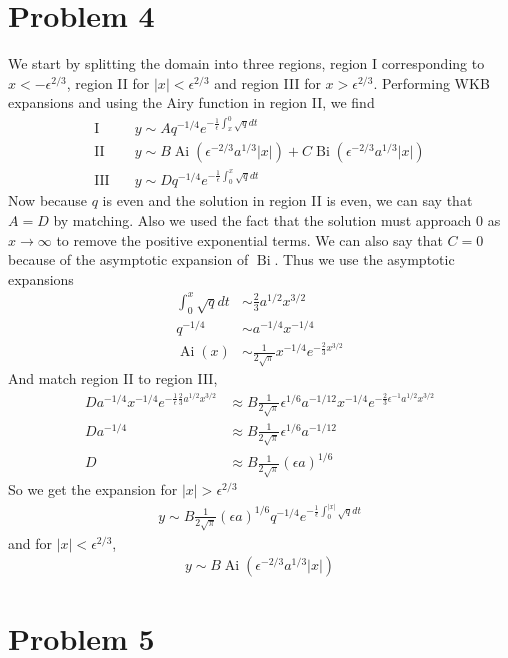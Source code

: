 \documentclass[12pt]{article}
\newcommand{\eq}[1]{\begin{align*}#1\end{align*}}
\newcommand{\Ai}{\operatorname{Ai}}
\newcommand{\Bi}{\operatorname{Bi}}
\begin{document}
\section*{Problem 4} We start by splitting the domain into three regions, region I corresponding to $x < -\epsilon^{2/3}$, region II for $|x| < \epsilon^{2/3}$ and region III for $x > \epsilon^{2/3}$. Performing WKB expansions and using the Airy function in region II, we find
\eq{
	\text{I}\quad& y \sim A q^{-1/4} e^{-\frac{1}{\epsilon}\int_x^0 \sqrt{q} dt}\\
	\text{II}\quad& y \sim B \Ai(\epsilon^{-2/3} a^{1/3} |x|) + C \Bi(\epsilon^{-2/3} a^{1/3} |x|)\\
	\text{III}\quad& y \sim D q^{-1/4} e^{-\frac{1}{\epsilon}\int_0^x \sqrt{q} dt}
}
Now because $q$ is even and the solution in region II is even, we can say that $A = D$ by matching. Also we used the fact that the solution must approach 0 as $x \rightarrow \infty$ to remove the positive exponential terms. We can also say that $C = 0$ because of the asymptotic expansion of $\Bi$. Thus we use the asymptotic expansions
\eq{
	\int_0^x \sqrt{q} dt &\sim \frac{2}{3}a^{1/2}x^{3/2}\\
	q^{-1/4} &\sim a^{-1/4}x^{-1/4}\\
	\Ai(x) &\sim \frac{1}{2\sqrt{\pi}} x^{-1/4}e^{-\frac{2}{3}x^{3/2}}
}
And match region II to region III,
\eq{
	Da^{-1/4}x^{-1/4}e^{-\frac{1}{\epsilon} \frac{2}{3} a^{1/2} x^{3/2}} &\approx B\frac{1}{2\sqrt{\pi}} \epsilon^{1/6}a^{-1/12}x^{-1/4}e^{-\frac{2}{3} \epsilon^{-1} a^{1/2} x^{3/2}}\\
	Da^{-1/4}&\approx B\frac{1}{2\sqrt{\pi}} \epsilon^{1/6}a^{-1/12}\\
	D &\approx B\frac{1}{2\sqrt{\pi}} (\epsilon a)^{1/6}
}
So we get the expansion for $|x| > \epsilon^{2/3}$
\eq{
	y \sim B\frac{1}{2\sqrt{\pi}} (\epsilon a)^{1/6} q^{-1/4} e^{-\frac{1}{\epsilon}\int_0^|x| \sqrt{q} dt}
}
and for $|x| < \epsilon^{2/3}$,
\eq{
	y \sim B \Ai(\epsilon^{-2/3} a^{1/3} |x|)
}
\section*{Problem 5}
\end{document}
